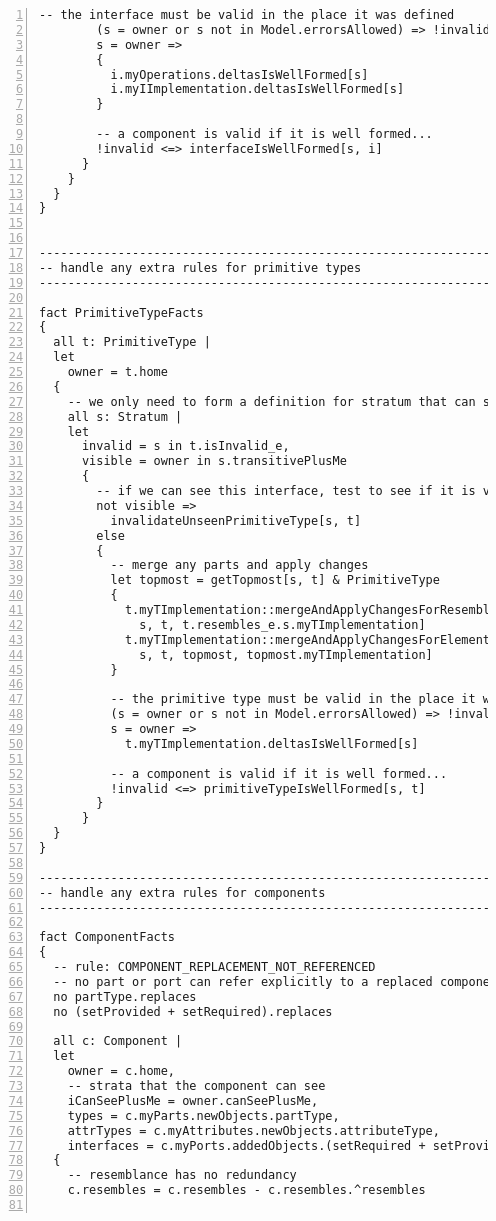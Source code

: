 \begin{lstlisting}[caption={bb.als}, numbers=left]
        -- the interface must be valid in the place it was defined
        (s = owner or s not in Model.errorsAllowed) => !invalid
        s = owner =>
        {
          i.myOperations.deltasIsWellFormed[s]
          i.myIImplementation.deltasIsWellFormed[s]
        }
        
        -- a component is valid if it is well formed...
        !invalid <=> interfaceIsWellFormed[s, i]
      }
    }
  }
}


--------------------------------------------------------------------
-- handle any extra rules for primitive types
--------------------------------------------------------------------

fact PrimitiveTypeFacts
{
  all t: PrimitiveType |
  let
    owner = t.home
  {
    -- we only need to form a definition for stratum that can see us
    all s: Stratum |
    let
      invalid = s in t.isInvalid_e,
      visible = owner in s.transitivePlusMe
      {
        -- if we can see this interface, test to see if it is valid in this stratum
        not visible =>
          invalidateUnseenPrimitiveType[s, t]
        else
        {
          -- merge any parts and apply changes
          let topmost = getTopmost[s, t] & PrimitiveType
          {
            t.myTImplementation::mergeAndApplyChangesForResemblance[
              s, t, t.resembles_e.s.myTImplementation]
            t.myTImplementation::mergeAndApplyChangesForElementReplacement[
              s, t, topmost, topmost.myTImplementation]
          }
  
          -- the primitive type must be valid in the place it was defined
          (s = owner or s not in Model.errorsAllowed) => !invalid
          s = owner =>
            t.myTImplementation.deltasIsWellFormed[s]
          
          -- a component is valid if it is well formed...
          !invalid <=> primitiveTypeIsWellFormed[s, t]
        }
      }
  }
}

--------------------------------------------------------------------
-- handle any extra rules for components
--------------------------------------------------------------------

fact ComponentFacts
{
  -- rule: COMPONENT_REPLACEMENT_NOT_REFERENCED
  -- no part or port can refer explicitly to a replaced component or interface
  no partType.replaces
  no (setProvided + setRequired).replaces

  all c: Component |
  let
    owner = c.home,
    -- strata that the component can see
    iCanSeePlusMe = owner.canSeePlusMe,
    types = c.myParts.newObjects.partType,
    attrTypes = c.myAttributes.newObjects.attributeType,
    interfaces = c.myPorts.addedObjects.(setRequired + setProvided)
  {
    -- resemblance has no redundancy
    c.resembles = c.resembles - c.resembles.^resembles


\end{lstlisting}
